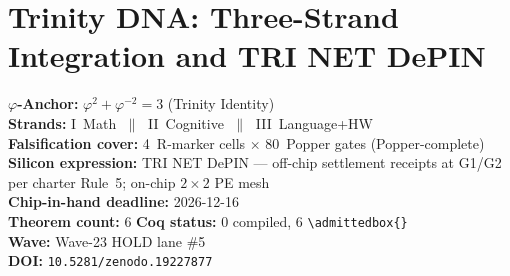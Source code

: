 
\chapter{Trinity DNA: Three-Strand Integration and TRI NET DePIN}
\label{ch74:trinity-dna-capstone}

\begin{tcolorbox}[colback=gold!5,colframe=gold!60,
  title=Chapter Anchor — flos\_74 Capstone]
  \textbf{$\varphi$-Anchor:}
  $\varphi^2 + \varphi^{-2} = 3$ \quad (Trinity Identity) \\[2pt]
  \textbf{Strands:}
  I~Math $\;\|\;$ II~Cognitive $\;\|\;$ III~Language+HW \\[2pt]
  \textbf{Falsification cover:}
  4~R-marker cells $\times$ 80~Popper gates (Popper-complete) \\[2pt]
  \textbf{Silicon expression:}
  TRI NET DePIN — off-chip settlement receipts at G1/G2
  per charter Rule~5; on-chip $2{\times}2$ PE mesh \\[2pt]
  \textbf{Chip-in-hand deadline:} 2026-12-16 \\[2pt]
  \textbf{Theorem count:} 6 \quad
  \textbf{Coq status:} 0 compiled, 6 \verb|\admittedbox{}| \\[2pt]
  \textbf{Wave:} Wave-23 HOLD lane \#5 \\[2pt]
  \textbf{DOI:} \texttt{10.5281/zenodo.19227877}
\end{tcolorbox}

